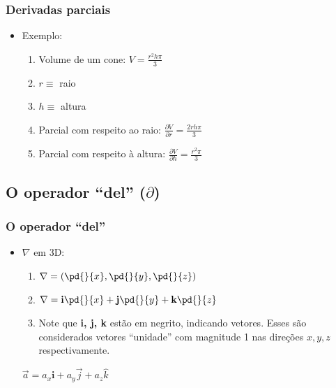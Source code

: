 \begin{frame}
\frametitle{Derivadas parciais}

  \begin{itemize}[<+-| alert@+>]
    \item Exemplo:
      \begin{enumerate}[<+-| alert@+>]
        \item Volume de um cone: $V = \frac{r^2h\pi}{3}$
        \item $r \equiv$ raio
        \item $h \equiv$ altura
        \item Parcial com respeito ao raio:
              $\frac{\partial V}{\partial r} = \frac{2rh\pi}{3}$
        \item Parcial com respeito à altura:
              $\frac{\partial V}{\partial h} = \frac{r^2\pi}{3}$
      \end{enumerate}
  \end{itemize}

\end{frame}


\subsection{O operador ``del'' ($\partial$)}

\begin{frame}
\frametitle{O operador ``del''}

  \begin{itemize}[<+-| alert@+>]
    \item $\nabla$ em 3D:
      \begin{enumerate}[<+-| alert@+>]
        \item $\nabla = \left( \pd{}{x}, \pd{}{y}, \pd{}{z} \right)$
        \item $\nabla = \mathbf{i}\pd{}{x} + \mathbf{j}\pd{}{y} + \mathbf{k}\pd{}{z}$
        \item Note que {\bf i, j, k} estão em negrito, indicando vetores.
              Esses são considerados vetores ``unidade'' com magnitude 1 nas
              direções $x, y, z$ respectivamente.
      \end{enumerate}
      \pause
      $\vec{a} = a_x\mathbf{i} + a_y\vec{j} + a_z{\hat{k}}$
  \end{itemize}

\end{frame}



